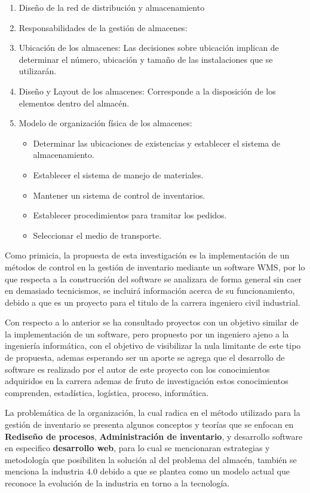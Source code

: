 \documentclass[11pt]{article}
\providecommand{\tightlist}{%
      \setlength{\itemsep}{0pt}\setlength{\parskip}{0pt}}
\begin{document}
\begin{enumerate}
\def\labelenumi{\arabic{enumi}.}
\item
  Diseño de la red de distribución y almacenamiento
\item
  Responsabilidades de la gestión de almacenes:
\item
  Ubicación de los almacenes: Las decisiones sobre ubicación implican de
  determinar el número, ubicación y tamaño de las instalaciones que se
  utilizarán.
\item
  Diseño y Layout de los almacenes: Corresponde a la disposición de los
  elementos dentro del almacén.
\item
  Modelo de organización física de los almacenes:

  \begin{itemize}
  \tightlist
  \item
    Determinar las ubicaciones de existencias y establecer el sistema de
    almacenamiento.
  \item
    Establecer el sistema de manejo de materiales.
  \item
    Mantener un sistema de control de inventarios.
  \item
    Establecer procedimientos para tramitar los pedidos.
  \item
    Seleccionar el medio de transporte.
  \end{itemize}
\end{enumerate}

Como primicia, la propuesta de esta investigación es la implementación
de un métodos de control en la gestión de inventario mediante un
software WMS, por lo que respecta a la construcción del software se
analizara de forma general sin caer en demasiado tecnicismos, se
incluirá información acerca de su funcionamiento, debido a que es un
proyecto para el titulo de la carrera ingeniero civil industrial.

Con respecto a lo anterior se ha consultado proyectos con un objetivo
similar de la implementación de un software, pero propuesto por un
ingeniero ajeno a la ingeniería informática, con el objetivo de
visibilizar la nula limitante de este tipo de propuesta, ademas
esperando ser un aporte se agrega que el desarrollo de software es
realizado por el autor de este proyecto con los conocimientos adquiridos
en la carrera ademas de fruto de investigación estos conocimientos
comprenden, estadística, logística, proceso, informática.

La problemática de la organización, la cual radica en el método
utilizado para la gestión de inventario se presenta algunos conceptos y
teorías que se enfocan en \textbf{Rediseño de procesos},
\textbf{Administración de inventario}, y desarrollo software en
especifico \textbf{desarrollo web}, para lo cual se mencionaran
estrategias y metodología que posibiliten la solución al del problema
del almacén, también se menciona la industria 4.0 debido a que se
plantea como un modelo actual que reconoce la evolución de la industria
en torno a la tecnología.
\end{document}
